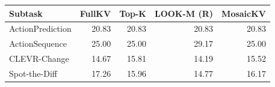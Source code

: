 \begin{tabular}{lrrrr}
\toprule
Subtask & FullKV & Top-K & LOOK-M (R) & MosaicKV\\\midrule
ActionPrediction & 20.83 & 20.83 & 20.83 & 20.83\\
ActionSequence & 25.00 & 25.00 & 29.17 & 25.00\\
CLEVR{-}Change & 14.67 & 15.81 & 14.19 & 15.52\\
Spot{-}the{-}Diff & 17.26 & 15.96 & 14.77 & 16.17\\
\bottomrule
\end{tabular}
